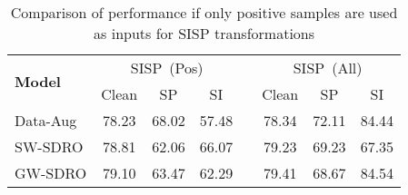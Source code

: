 \begin{table}
    \centering
    \begin{tabular}{@{}l ccc c ccc@{}}
        \toprule
        \multirow{2}{*}{\textbf{Model}} & \multicolumn{3}{c}{SISP~(Pos)} & \hphantom & \multicolumn{3}{c}{SISP~(All)} \\ 
         \cmidrule{2-4} \cmidrule{6-8}
         & Clean & SP & SI && Clean & SP & SI \\
        \midrule
        Data-Aug & 78.23 & 68.02 & 57.48 && 78.34 & 72.11 & 84.44 \\
        SW-SDRO  & 78.81 & 62.06 & 66.07 && 79.23 & 69.23 & 67.35 \\
        GW-SDRO  & 79.10 & 63.47 & 62.29 && 79.41 & 68.67 & 84.54\\
        \bottomrule
    \end{tabular}
    \caption{Comparison of performance if only positive samples 
    are used as inputs for SISP transformations
    }
    \label{tab:analysis_pos_all}
\end{table}